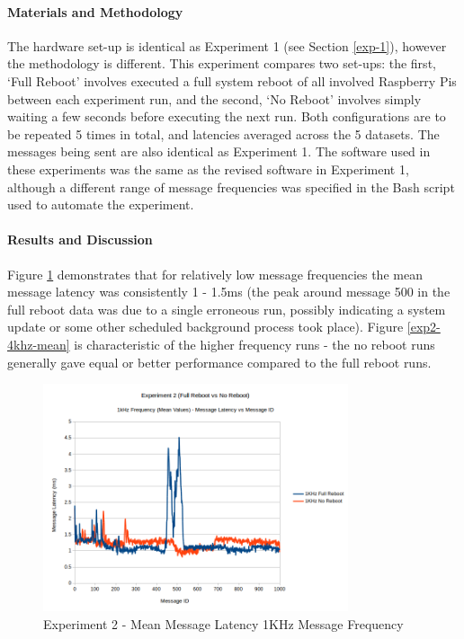 \documentclass[../dissertation.tex]{subfiles}
\begin{document}
\paragraph{Materials and Methodology} The hardware set-up is identical as Experiment 1 (see Section \ref{exp-1}), however the methodology is different. This experiment compares two set-ups: the first, `Full Reboot' involves executed a full system reboot of all involved Raspberry Pis between each experiment run, and the second, `No Reboot' involves simply waiting a few seconds before executing the next run. Both configurations are to be repeated 5 times in total, and latencies averaged across the 5 datasets. The messages being sent are also identical as Experiment 1. The software used in these experiments was the same as the revised software\cite{Experiment1NoEchoDelayCode} in Experiment 1, although a different range of message frequencies was specified in the Bash script used to automate the experiment.

\paragraph{Results and Discussion} Figure \ref{exp2-1khz-mean} demonstrates that for relatively low message frequencies the mean message latency was consistently 1 - 1.5ms (the peak around message 500 in the full reboot data was due to a single erroneous run, possibly indicating a system update or some other scheduled background process took place). Figure \ref{exp2-4khz-mean} is characteristic of the higher frequency runs - the no reboot runs generally gave equal or better performance compared to the full reboot runs.

\begin{figure}[H]
\centering
\includegraphics[width=0.8\textwidth]{images/experiment2/1khz-mean.png}
\caption{Experiment 2 - Mean Message Latency 1KHz Message Frequency}
\label{exp2-1khz-mean}
\end{figure}
\end{document}
